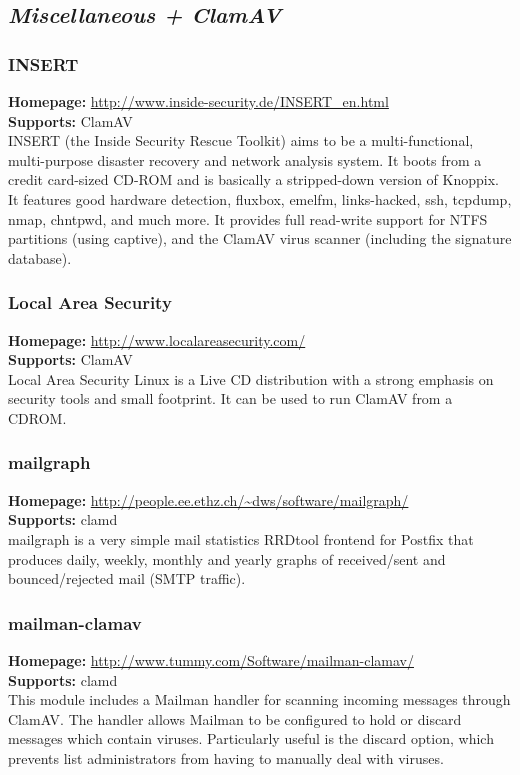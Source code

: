\documentclass[a4paper,titlepage,12pt]{article}
\begin{document}
    \subsection{\emph{Miscellaneous + ClamAV}}

    \subsubsection{INSERT}
    \textbf{Homepage:} \url{http://www.inside-security.de/INSERT_en.html}\\
    \textbf{Supports:} ClamAV\\[4pt]
    INSERT (the Inside Security Rescue Toolkit) aims to be a multi-functional,
    multi-purpose disaster recovery and network analysis system. It boots from
    a credit card-sized CD-ROM and is basically a stripped-down version of
    Knoppix. It features good hardware detection, fluxbox, emelfm,
    links-hacked, ssh, tcpdump, nmap, chntpwd, and much more. It provides full
    read-write support for NTFS partitions (using captive), and the ClamAV
    virus scanner (including the signature database). 

    \subsubsection{Local Area Security}
    \textbf{Homepage:} \url{http://www.localareasecurity.com/}\\
    \textbf{Supports:} ClamAV\\[4pt]
    Local Area Security Linux is a Live CD distribution with a strong
    emphasis on security tools and small footprint. It can be used to run
    ClamAV from a CDROM. 

    \subsubsection{mailgraph}
    \textbf{Homepage:} \url{http://people.ee.ethz.ch/~dws/software/mailgraph/}\\
    \textbf{Supports:} clamd\\[4pt]
    mailgraph is a very simple mail statistics RRDtool frontend for Postfix
    that produces daily, weekly, monthly and yearly graphs of received/sent
    and bounced/rejected mail (SMTP traffic).

    \subsubsection{mailman-clamav}
    \textbf{Homepage:} \url{http://www.tummy.com/Software/mailman-clamav/}\\
    \textbf{Supports:} clamd\\[4pt]
    This module includes a Mailman handler for scanning incoming messages
    through ClamAV. The handler allows Mailman to be configured to hold or
    discard messages which contain viruses. Particularly useful is the
    discard option, which prevents list administrators from having to
    manually deal with viruses.
\end{document}
